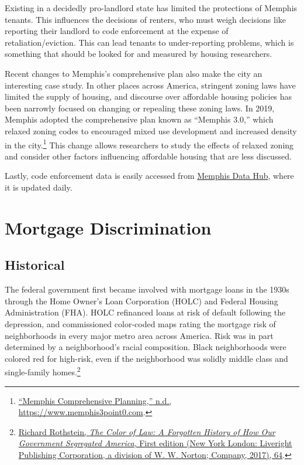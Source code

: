 \documentclass[
  openany]{book}
\begin{document}
Existing in a decidedly pro-landlord state has limited the protections of Memphis tenants. This influences the decisions of renters, who must weigh decisions like reporting their landlord to code enforcement at the expense of retaliation/eviction. This can lead tenants to under-reporting problems, which is something that should be looked for and measured by housing researchers.

Recent changes to Memphis's comprehensive plan also make the city an interesting case study. In other places across America, stringent zoning laws have limited the supply of housing, and discourse over affordable housing policies has been narrowly focused on changing or repealing these zoning laws. In 2019, Memphis adopted the comprehensive plan known as ``Memphis 3.0,'' which relaxed zoning codes to encouraged mixed use development and increased density in the city.\footnote{\protect\hyperlink{ref-memphis30}{{``Memphis Comprehensive Planning,''} n.d., \url{https://www.memphis3point0.com}}.} This change allows researchers to study the effects of relaxed zoning and consider other factors influencing affordable housing that are less discussed.

Lastly, code enforcement data is easily accessed from \href{https://data.memphistn.gov/dataset/Service-Requests-since-2016/hmd4-ddta}{Memphis Data Hub}, where it is updated daily.

\hypertarget{mortgage-discrimination}{%
\section{Mortgage Discrimination}\label{mortgage-discrimination}}

\hypertarget{historical}{%
\subsection{Historical}\label{historical}}

The federal government first became involved with mortgage loans in the 1930s through the Home Owner's Loan Corporation (HOLC) and Federal Housing Administration (FHA). HOLC refinanced loans at risk of default following the depression, and commissioned color-coded maps rating the mortgage risk of neighborhoods in every major metro area across America. Risk was in part determined by a neighborhood's racial composition. Black neighborhoods were colored red for high-risk, even if the neighborhood was solidly middle class and single-family homes.\footnote{\protect\hyperlink{ref-rothstein2017}{Richard Rothstein, \emph{The Color of Law: A Forgotten History of How Our Government Segregated America}, First edition (New York London: Liveright Publishing Corporation, a division of W. W. Norton; Company, 2017), 64}.}
\end{document}
